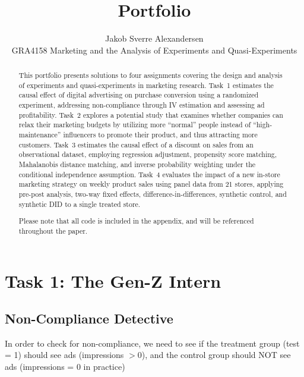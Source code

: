 \documentclass[10pt]{article}
\begin{document}
\title{Portfolio}
\author{Jakob Sverre Alexandersen\\
GRA4158 Marketing and the Analysis of Experiments and Quasi-Experiments}
\maketitle

\begin{abstract}
    \noindent
    This portfolio presents solutions to four assignments covering 
    the design and analysis of experiments and quasi-experiments in 
    marketing research. Task~1 estimates the causal effect of digital advertising on purchase conversion using a randomized experiment, addressing non-compliance through IV estimation and assessing ad profitability. Task~2 explores a potential study that examines whether companies can relax their marketing budgets by utilizing more ``normal'' people instead of ``high-maintenance'' influencers to promote their product, and thus attracting more customers.
    Task~3 estimates the causal effect of a discount on sales from an observational dataset, employing regression adjustment, propensity score matching, Mahalanobis distance matching, and inverse probability weighting under the conditional independence assumption. Task~4 evaluates the impact of a new in-store marketing strategy on weekly product sales using panel data from 21 stores, applying pre-post analysis, two-way fixed effects, difference-in-differences, synthetic control, and synthetic DID to a single treated store.

    Please note that all code is included in the appendix, and will be referenced throughout the paper. 
\end{abstract}
    

\newpage
\tableofcontents
\newpage


\section{Task 1: The Gen-Z Intern}

\subsection{Non-Compliance Detective}
In order to check for non-compliance, we need to see if the treatment group (test = 1) should see ads (impressions $> 0$), and the control group should NOT see ads (impressions = 0 in practice)
\end{document}
